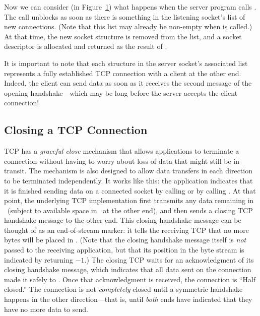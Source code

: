 Now we can consider (in Figure~\ref{fsm1c}) what happens when the
server program calls .
The call unblocks as soon as there is something in the listening
socket's list of new connections. 
(Note that this list may already be non-empty when 
is called.)  At that time, the new socket structure is removed from the list,
and a socket descriptor is allocated and returned as the result of
.

\begin{figure}
\caption{\label{fsm1c}}
\end{figure}

It is important to note that each structure in the
server socket's associated list
represents a fully established TCP connection with a client at the
other end.  Indeed, the client can send data as soon as it receives
the second message of the opening handshake---which may be long before
the server accepts the client connection!

\subsection{Closing a TCP Connection}
\label{sect:closingTCP}%

TCP has a \emph{graceful close} mechanism that allows applications to
terminate a connection without having to worry about loss of data that
might still be in transit.  The mechanism is also designed to allow
data transfers in each direction to be terminated independently.
It works like
this: the application indicates that it is finished sending data on a
connected socket by calling  or by
calling .  At
that point, the underlying TCP implementation first transmits any data
remaining in \sque\ (subject to available space in
\rque\ at the other end), and then sends a closing TCP
handshake message to the other end.  This closing handshake message
can be thought of as an end-of-stream marker: it tells the
receiving TCP that no more bytes will be placed in \rque.
(Note that the closing handshake message itself is \emph{not} passed
to the receiving application, but that its position in the byte stream
is indicated by  returning $-1$.)  The closing TCP waits
for an acknowledgment of its closing handshake message, which
indicates that all data sent on the connection made it safely to
\rque.  Once that acknowledgment is received, the connection is
``Half closed.''
%
The connection is not \emph{completely} closed until a symmetric
handshake happens in the other direction---that is, until \emph{both}
ends have indicated that they have no more data to send.


